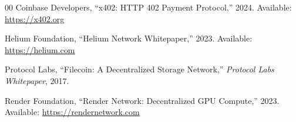 \documentclass[conference]{IEEEtran}
\begin{document}
\begin{thebibliography}{00}
Coinbase Developers, ``x402: HTTP 402 Payment Protocol,'' 2024.
Available: \url{https://x402.org}

Helium Foundation, ``Helium Network Whitepaper,'' 2023.
Available: \url{https://helium.com}

Protocol Labs, ``Filecoin: A Decentralized Storage Network,''
\textit{Protocol Labs Whitepaper}, 2017.

Render Foundation, ``Render Network: Decentralized GPU Compute,'' 2023.
Available: \url{https://rendernetwork.com}

\end{thebibliography}
\end{document}
